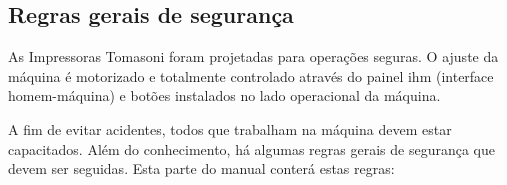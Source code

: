 \subsection{Regras gerais de segurança}
As Impressoras Tomasoni foram projetadas para operações seguras. O ajuste da máquina é motorizado e
totalmente controlado através do painel ihm (interface homem-máquina) e botões instalados no lado operacional da máquina.

 A fim de evitar acidentes, todos que trabalham na máquina devem estar capacitados. Além do conhecimento, há
algumas regras gerais de segurança que devem ser seguidas. Esta parte do manual conterá estas regras:


